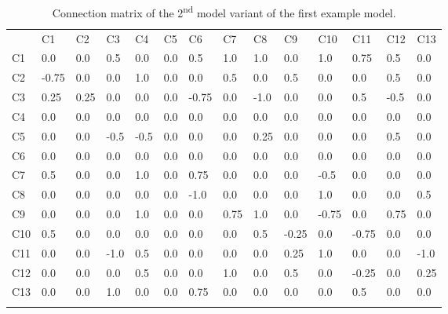 \documentclass[graybox]{svmult}
\begin{document}
\begin{table}
\caption{Connection matrix of the 2\textsuperscript{nd} model variant of the first example model.}
\label{tab:V2connectionMtx}
\begin{center}
\begin{tabular}{l|lllllllllllll}
\hline\noalign{\smallskip}
 &      C1 &    C2 &    C3 &    C4 &    C5 &    C6 &    C7 &    C8 &    C9 &    C10 &   C11 &   C12 &   C13\\
\noalign{\smallskip}\hline\noalign{\smallskip}
C1 &    0.0 &   0.0 &   0.5 &   0.0 &   0.0 &   0.5 &   1.0 &   1.0 &   0.0 &   1.0 &   0.75 &  0.5 &   0.0\\
C2 &    -0.75 & 0.0 &   0.0 &   1.0 &   0.0 &   0.0 &   0.5 &   0.0 &   0.5 &   0.0 &   0.0 &   0.5 &   0.0\\
C3 &    0.25 &  0.25 &  0.0 &   0.0 &   0.0 &   -0.75 & 0.0 &   -1.0 &  0.0 &   0.0 &   0.5 &   -0.5 &  0.0\\
C4 &    0.0 &   0.0 &   0.0 &   0.0 &   0.0 &   0.0 &   0.0 &   0.0 &   0.0 &   0.0 &   0.0 &   0.0 &   0.0\\
C5 &    0.0 &   0.0 &   -0.5 &  -0.5 &  0.0 &   0.0 &   0.0 &   0.25 &  0.0 &   0.0 &   0.0 &   0.5 &   0.0\\
C6 &    0.0 &   0.0 &   0.0 &   0.0 &   0.0 &   0.0 &   0.0 &   0.0 &   0.0 &   0.0 &   0.0 &   0.0 &   0.0\\
C7 &    0.5 &   0.0 &   0.0 &   1.0 &   0.0 &   0.75 &  0.0 &   0.0 &   0.0 &   -0.5 &  0.0 &   0.0 &   0.0\\
C8 &    0.0 &   0.0 &   0.0 &   0.0 &   0.0 &   -1.0 &  0.0 &   0.0 &   0.0 &   1.0 &   0.0 &   0.0 &   0.5\\
C9 &    0.0 &   0.0 &   0.0 &   1.0 &   0.0 &   0.0 &   0.75 &  1.0 &   0.0 &   -0.75 & 0.0 &   0.75 &  0.0\\
C10 &   0.5 &   0.0 &   0.0 &   0.0 &   0.0 &   0.0 &   0.0 &   0.5 &   -0.25 & 0.0 &   -0.75 & 0.0 &   0.0\\
C11 &   0.0 &   0.0 &   -1.0 &  0.5 &   0.0 &   0.0 &   0.0 &   0.0 &   0.25 &  1.0 &   0.0 &   0.0 &   -1.0\\
C12 &   0.0 &   0.0 &   0.0 &   0.5 &   0.0 &   0.0 &   1.0 &   0.0 &   0.5 &   0.0 &   -0.25 & 0.0 &   0.25\\
C13 &   0.0 &   0.0 &   1.0 &   0.0 &   0.0 &   0.75 &  0.0 &   0.0 &   0.0 &   0.0 &   0.5 &   0.0 &   0.0\\
\noalign{\smallskip}\hline
\end{tabular}
\end{center}
\end{table}
\end{document}
